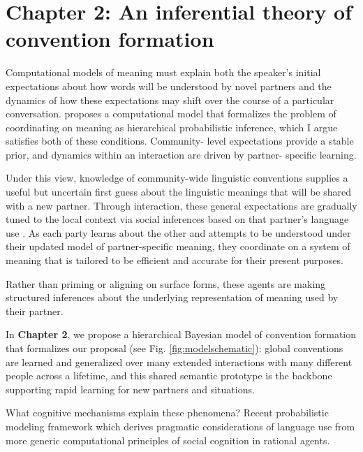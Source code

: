 \documentclass[11pt]{article}
\begin{document}
\section*{Chapter 2: An inferential theory of convention formation}


Computational models of meaning must explain both the speaker’s initial expectations about how words will be understood by novel partners and the dynamics of how these expectations may shift over the course of a particular conversation. proposes a computational model that formalizes the problem of coordinating on meaning as hierarchical probabilistic inference, which I argue satisfies both of these conditions. Community- level expectations provide a stable prior, and dynamics within an interaction are driven by partner- specific learning.


Under this view, knowledge of community-wide linguistic conventions \cite{Lewis69_Convention} supplies a useful but uncertain first guess about the linguistic meanings that will be shared with a new partner. 
Through interaction, these general expectations are gradually tuned to the local context via social inferences based on that partner's language use  \cite{clark_using_1996,davidson_nice_1986}. 
As each party learns about the other and attempts to be understood under their updated model of partner-specific meaning, they coordinate on a system of meaning that is tailored to be efficient and accurate for their present purposes.

Rather than priming or aligning on surface forms, these agents are making structured inferences about the underlying representation of meaning used by their partner.

In \textbf{Chapter 2}, we propose a hierarchical Bayesian model of convention formation that formalizes our proposal (see Fig. \ref{fig:modelschematic}): global conventions are learned and generalized over many extended interactions with many different people across a lifetime, and this shared semantic prototype is the backbone supporting rapid learning for new partners and situations. 

What cognitive mechanisms explain these phenomena? 
Recent probabilistic modeling framework which derives pragmatic considerations of language use from more generic computational principles of social cognition in rational agents.
\end{document}
